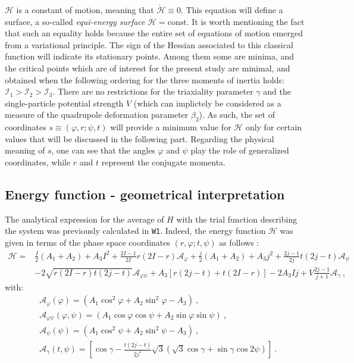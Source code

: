 \documentclass[myclassdoc,debug]{rjparticle}
\begin{document}
$\mathcal{H}$ is a constant of motion, meaning that $\dot{\mathcal{H}}\equiv0$. This equation will define a surface, a so-called \emph{equi-energy surface} $\mathcal{H}=\text{const}$. It is worth mentioning the fact that such an equality holds because the entire set of equations of motion emerged from a variational principle. The sign of the Hessian associated to this classical function will indicate its stationary points. Among them some are minima, and the critical points which are of interest for the present study are minimal, and obtained when the following ordering for the three moments of inertia holds: $\mathcal{I}_1>\mathcal{I}_2>\mathcal{I}_3$. There are no restrictions for the triaxiality parameter $\gamma$ and the single-particle potential strength $V$ (which can implictely be considered as a measure of the quadrupole deformation parameter $\beta_2$). As such, the set of coordinates $s\equiv(\varphi,r;\psi,t)$ will provide a minimum value for $\mathcal{H}$ only for certain values that will be discussed in the following part. Regarding the physical meaning of $s$, one can see that the angles $\varphi$ and $\psi$ play the role of generalized coordinates, while $r$ and $t$ represent the conjugate momenta.

\subsection{Energy function - geometrical interpretation}

The analytical expression for the average of $H$ with the trial function describing the system was previously calculated in \texttt{W1}. Indeed, the energy function $\mathcal{H}$ was given in terms of the phase space coordinates $(r,\varphi;t,\psi)$ as follows \cite{raduta2020approach}:
\begin{align}
    \mathcal{H}=&\frac{I}{2}(A_1+A_2)+A_3I^2+\frac{2I-1}{2I}r(2I-r)\mathcal{A}_\varphi+\frac{j}{2}(A_1+A_2)+A_3j^2+\frac{2j-1}{2j}t(2j-t)\mathcal{A}_\psi \nonumber\\
    &-2\sqrt{r(2I-r)t(2j-t)}\mathcal{A}_{\varphi\psi}+A_3\left[r(2j-t)+t(2I-r)\right]-2A_3Ij+V\frac{2j-1}{j+1}\mathcal{A}_\gamma\ ,
    \label{energy-function-analytical}
\end{align}
with:
\begin{align}
    &\mathcal{A}_\varphi(\varphi)=(A_1\cos^2\varphi+A_2\sin^2\varphi-A_3)\ , \nonumber\\
    &\mathcal{A}_{\varphi\psi}(\varphi,\psi)=(A_1\cos\varphi\cos\psi+A_2\sin\varphi\sin\psi)\ ,\nonumber\\
    &\mathcal{A}_\psi(\psi)=(A_1\cos^2\psi+A_2\sin^2\psi-A_3)\ , \nonumber\\
    &\mathcal{A}_\gamma(t,\psi)=\left[\cos\gamma-\frac{t(2j-t)}{2j^2}\sqrt{3}(\sqrt{3}\cos\gamma+\sin\gamma\cos2\psi)\right]\ .
\end{align}
\end{document}
